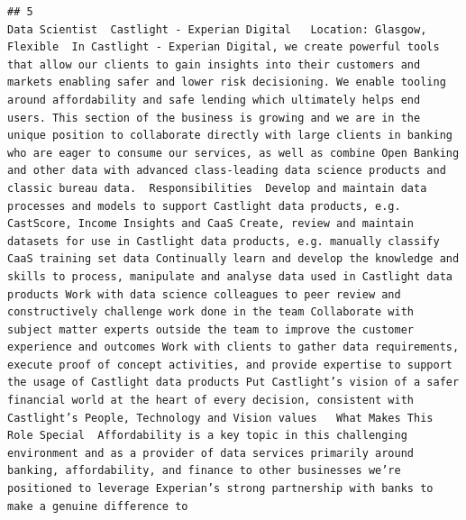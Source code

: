 \documentclass[
]{article}
\begin{document}
\begin{verbatim}
## 5                                                                                                                                                                                                                                                                                                                                                                                                                                                                                                                                                                                                                                                                                                                                                                                                                                                                                                                                                                                                                                                                                                                                                                                                                                                                                                                                                                                                                                                                                                                                               Data Scientist  Castlight - Experian Digital   Location: Glasgow, Flexible  In Castlight - Experian Digital, we create powerful tools that allow our clients to gain insights into their customers and markets enabling safer and lower risk decisioning. We enable tooling around affordability and safe lending which ultimately helps end users. This section of the business is growing and we are in the unique position to collaborate directly with large clients in banking who are eager to consume our services, as well as combine Open Banking and other data with advanced class-leading data science products and classic bureau data.  Responsibilities  Develop and maintain data processes and models to support Castlight data products, e.g. CastScore, Income Insights and CaaS Create, review and maintain datasets for use in Castlight data products, e.g. manually classify CaaS training set data Continually learn and develop the knowledge and skills to process, manipulate and analyse data used in Castlight data products Work with data science colleagues to peer review and constructively challenge work done in the team Collaborate with subject matter experts outside the team to improve the customer experience and outcomes Work with clients to gather data requirements, execute proof of concept activities, and provide expertise to support the usage of Castlight data products Put Castlight’s vision of a safer financial world at the heart of every decision, consistent with Castlight’s People, Technology and Vision values   What Makes This Role Special  Affordability is a key topic in this challenging environment and as a provider of data services primarily around banking, affordability, and finance to other businesses we’re positioned to leverage Experian’s strong partnership with banks to make a genuine difference to 
\end{verbatim}
\end{document}
